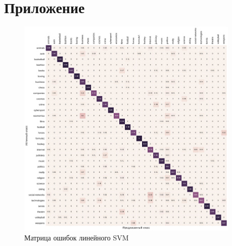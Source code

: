\documentclass[a4paper, 14pt]{extarticle}
\begin{document}
\section{Приложение}
\begin{figure}[h!]
	\centering
	\includegraphics[width=0.95\textwidth]{svm_confusion_matrix.pdf}
	\caption{Матрица ошибок линейного SVM}
	\label{svm_confusion}
\end{figure}
\end{document}
